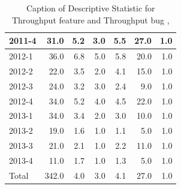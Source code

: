\documentclass[UKenglish]{ifimaster}  %
\begin{document}
\begin{appendices}
\begin{table}[!htbp]
\begin{adjustwidth}{-2.5cm}{}
{{\begin{tabular}{ | l | r | r | r | r | r | r | }
2011-4 & 31.0 & 5.2 & 3.0 & 5.5 & 27.0 & 1.0\\ \hline
2012-1 & 36.0 & 6.8 & 5.0 & 5.8 & 20.0 & 1.0\\ \hline
2012-2 & 22.0 & 3.5 & 2.0 & 4.1 & 15.0 & 1.0\\ \hline
2012-3 & 24.0 & 3.2 & 3.0 & 2.4 & 9.0 & 1.0\\ \hline
2012-4 & 34.0 & 5.2 & 4.0 & 4.5 & 22.0 & 1.0\\ \hline
2013-1 & 34.0 & 3.4 & 2.0 & 3.0 & 10.0 & 1.0\\ \hline
2013-2 & 19.0 & 1.6 & 1.0 & 1.1 & 5.0 & 1.0\\ \hline
2013-3 & 21.0 & 2.1 & 1.0 & 2.2 & 11.0 & 1.0\\ \hline
2013-4 & 11.0 & 1.7 & 1.0 & 1.3 & 5.0 & 1.0\\ \hline
Total & 342.0 & 4.0 & 3.0 & 4.1 & 27.0 & 1.0\\ \hline
\end{tabular}
}
}
\end{adjustwidth}
\caption[Optional caption for list of figures]{Caption of Descriptive Statistic for Throughput feature and Throughput bug  , }
\label{DS:3:2}
\end{table}





\end{appendices}
\end{document}
